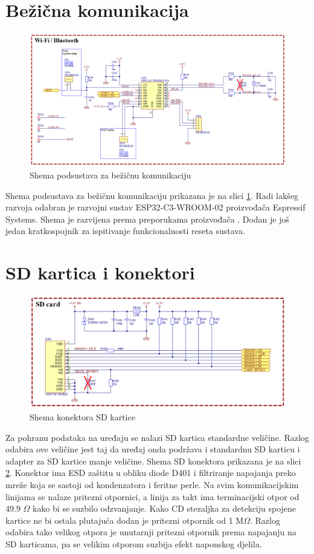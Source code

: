 \section{Bežična komunikacija}
\begin{figure}[hbt]
    \centering
    \includegraphics[width=\textwidth]{Figures/WIRELESS.png}
    \caption{Shema podsustava za bežičnu komunikaciju}
    \label{slk:WIFI}
\end{figure}
Shema podsustava za bežičnu komunikaciju prikazana je na slici \ref{slk:WIFI}. Radi lakšeg razvoja odabran je razvojni sustav ESP32-C3-WROOM-02 proizvođača Espressif Systems. Shema je razvijena prema preporukama proizvođača \cite{espressif:wroom02}. Dodan je još jedan kratkospojnik za ispitivanje funkcionalnosti reseta sustava.

\section{SD kartica i konektori}
\begin{figure}[hbt]
    \centering
    \includegraphics[width=\textwidth]{Figures/SD.png}
    \caption{Shema konektora SD kartice}
    \label{slk:SD}
\end{figure}

Za pohranu podataka na uređaju se nalazi SD kartica standardne veličine. Razlog odabira ove veličine jest taj da uređaj onda podržava i standardnu SD karticu i adapter za SD kartice manje veličine. Shema SD konektora prikazana je na slici \ref{slk:SD}. Konektor ima ESD zaštitu u obliku diode D401 i filtriranje napajanja preko mreže koja se sastoji od kondenzatora i feritne perle. Na svim komunikacijskim linijama se nalaze pritezni otpornici, a linija za takt ima terminacijski otpor od 49.9 $\Omega$ kako bi se suzbilo odzvanjanje. Kako CD stezaljka za detekciju spojene kartice ne bi ostala plutajuća dodan je pritezni otpornik od 1 M$\Omega$. Razlog odabira tako velikog otpora je unutarnji pritezni otpornik prema napajanju na SD karticama, pa se velikim otporom suzbija efekt naponskog djelila.

